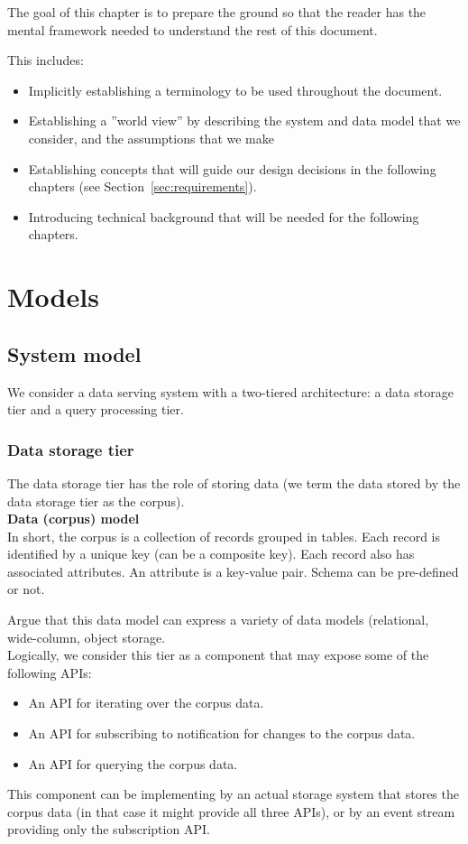 The goal of this chapter is to prepare the ground so that the reader has the
mental framework needed to understand the rest of this document.

This includes:
\begin{itemize}
  \item Implicitly establishing a terminology to be used throughout the
  document.
  \item Establishing a ''world view'' by describing the system and data model
  that we consider, and the assumptions that we make
  \item Establishing concepts that will guide our design decisions in the
  following chapters (see Section~\ref{sec:requirements}).
  \item Introducing technical background that will be needed for the following
  chapters.
\end{itemize}

\section{Models}
\subsection{System model}
We consider a data serving system with a two-tiered architecture: a data
storage tier and a query processing tier.


\subsubsection{Data storage tier}
The data storage tier has the role of storing data (we term the data stored by
the data storage tier as the corpus). \\

\textbf{Data (corpus) model} \\
In short, the corpus is a collection of records grouped in tables.
Each record is identified by a unique key (can be a composite key).
Each record also has associated attributes. An attribute is a key-value pair.
Schema can be pre-defined or not.

Argue that this data model can express a variety of data models (relational,
wide-column, object storage. \\

Logically, we consider this tier as a component that may expose some of the
following APIs:
\begin{itemize}
  \item An API for iterating over the corpus data.
  \item An API for subscribing to notification for changes to the corpus data.
  \item An API for querying the corpus data.
\end{itemize}
This component can be implementing by an actual storage system that stores the
corpus data (in that case it might provide all three APIs), or by an event
stream providing only the subscription API.

